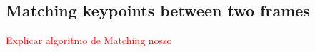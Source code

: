 \documentclass[]{IEEEtran}
\newcommand\todolist[1]{\textcolor{red}{#1}}
\begin{document}
 



\subsection{Matching keypoints between two frames}
\todolist{Explicar algoritmo de Matching nosso}
\end{document}
